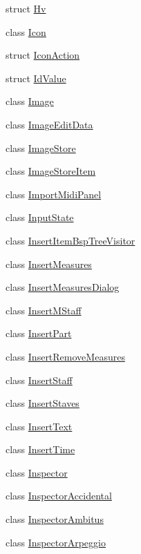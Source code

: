 \begin{DoxyCompactItemize}
struct \hyperlink{struct_ms_1_1_hv}{Hv}
\item 
class \hyperlink{class_ms_1_1_icon}{Icon}
\item 
struct \hyperlink{struct_ms_1_1_icon_action}{Icon\+Action}
\item 
struct \hyperlink{struct_ms_1_1_id_value}{Id\+Value}
\item 
class \hyperlink{class_ms_1_1_image}{Image}
\item 
class \hyperlink{class_ms_1_1_image_edit_data}{Image\+Edit\+Data}
\item 
class \hyperlink{class_ms_1_1_image_store}{Image\+Store}
\item 
class \hyperlink{class_ms_1_1_image_store_item}{Image\+Store\+Item}
\item 
class \hyperlink{class_ms_1_1_import_midi_panel}{Import\+Midi\+Panel}
\item 
class \hyperlink{class_ms_1_1_input_state}{Input\+State}
\item 
class \hyperlink{class_ms_1_1_insert_item_bsp_tree_visitor}{Insert\+Item\+Bsp\+Tree\+Visitor}
\item 
class \hyperlink{class_ms_1_1_insert_measures}{Insert\+Measures}
\item 
class \hyperlink{class_ms_1_1_insert_measures_dialog}{Insert\+Measures\+Dialog}
\item 
class \hyperlink{class_ms_1_1_insert_m_staff}{Insert\+M\+Staff}
\item 
class \hyperlink{class_ms_1_1_insert_part}{Insert\+Part}
\item 
class \hyperlink{class_ms_1_1_insert_remove_measures}{Insert\+Remove\+Measures}
\item 
class \hyperlink{class_ms_1_1_insert_staff}{Insert\+Staff}
\item 
class \hyperlink{class_ms_1_1_insert_staves}{Insert\+Staves}
\item 
class \hyperlink{class_ms_1_1_insert_text}{Insert\+Text}
\item 
class \hyperlink{class_ms_1_1_insert_time}{Insert\+Time}
\item 
class \hyperlink{class_ms_1_1_inspector}{Inspector}
\item 
class \hyperlink{class_ms_1_1_inspector_accidental}{Inspector\+Accidental}
\item 
class \hyperlink{class_ms_1_1_inspector_ambitus}{Inspector\+Ambitus}
\item 
class \hyperlink{class_ms_1_1_inspector_arpeggio}{Inspector\+Arpeggio}
\item 

\end{DoxyCompactItemize}
